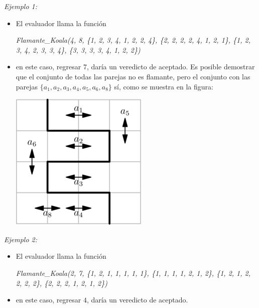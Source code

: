 \documentclass[12pt]{scrartcl}
\begin{document}
        {\itshape Ejemplo 1:}
        \begin{itemize}
            \item El evaluador llama la función 

            \begin{center}
                {\itshape Flamante\_Koala(4, 8, \{1, 2, 3, 4, 1, 2, 2, 4\}, \{2, 2, 2, 2, 4, 1, 2, 1\}, \{1, 2, 3, 4, 2, 3, 3, 4\}, \{3, 3, 3, 3, 4, 1, 2, 2\})}
            \end{center}
            
            \item en este caso, regresar $7$, daría un veredicto de aceptado. Es posible demostrar que el conjunto de todas las parejas no es flamante, pero el conjunto con las parejas $\{a_1, a_2, a_3, a_4, a_5, a_6, a_8\}$ sí, como se muestra en la figura:
            \begin{center}
                \includegraphics[scale=4]{ej1.png}
            \end{center}
        \end{itemize}
        
        {\itshape Ejemplo 2:}
        \begin{itemize}
            \item El evaluador llama la función 

            \begin{center}
                {\itshape Flamante\_Koala(2, 7, \{1, 2, 1, 1, 1, 1, 1\}, \{1, 1, 1, 1, 2, 1, 2\}, \{1, 2, 1, 2, 2, 2, 2\}, \{2, 2, 2, 1, 2, 1, 2\})}
            \end{center}
            
            \item en este caso, regresar $4$, daría un veredicto de aceptado. 
        \end{itemize}
        
\end{document}
